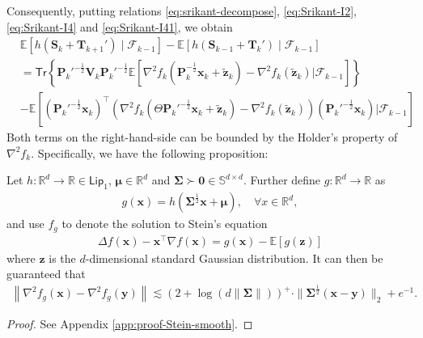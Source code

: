 \medskip
Consequently, putting relations \eqref{eq:srikant-decompose}, \eqref{eq:Srikant-I2}, \eqref{eq:Srikant-I4} and \eqref{eq:Srikant-I41}, we obtain
\begin{align}\label{eq:Srikant-reorganize}
&\mathbb{E}\left[h(\bm{S}_k + \bm{T}_{k+1}')\mid \mathscr{F}_{k-1}\right] - \mathbb{E}[h(\bm{S}_{k-1} + \bm{T}_k')\mid \mathscr{F}_{k-1}]\nonumber \\ 
&=\mathsf{Tr}\left\{\bm{P}_k'^{-\frac{1}{2}}\bm{V}_k\bm{P}_k'^{-\frac{1}{2}}\mathbb{E}\left[\nabla^2 f_k(\bm{P}_k^{-\frac{1}{2}}\bm{x}_k + \tilde{\bm{z}}_k)-\nabla^2 f_k(\tilde{\bm{z}}_k)\bigg|\mathscr{F}_{k-1}\right]\right\} \nonumber \\ 
&- \mathbb{E}\left[(\bm{P}_k'^{-\frac{1}{2}}\bm{x}_k)^\top (\nabla^2f_k(\Theta \bm{P}_k'^{-\frac{1}{2}}\bm{x}_k + \tilde{\bm{z}}_k) - \nabla^2 f_k(\tilde{\bm{z}}_k))(\bm{P}_k'^{-\frac{1}{2}}\bm{x}_k) \bigg|\mathscr{F}_{k-1}\right]
\end{align}
Both terms on the right-hand-side can be bounded by the Holder's property of $\nabla^2 f_k$. Specifically, we have the following proposition:
\begin{customproposition}\label{prop:Stein-smooth}
Let $h: \mathbb{R}^d \to \mathbb{R} \in \mathsf{Lip}_1$, $\bm{\mu} \in \mathbb{R}^d$ and $\bm{\Sigma} \succ \bm{0} \in \mathbb{S}^{d \times d}$. Further define $g: \mathbb{R}^d \to \mathbb{R}$ as
\begin{align*}
g(\bm{x})= h(\bm{\Sigma}^{\frac{1}{2}}\bm{x} +\bm{\mu}), \quad \forall x \in \mathbb{R}^d,
\end{align*}
and use $f_g$ to denote the solution to Stein's equation
\begin{align*}
\Delta f(\bm{x}) - \bm{x}^\top \nabla f(\bm{x}) = g(\bm{x}) - \mathbb{E}[g(\bm{z})]
\end{align*}
where $\bm{z}$ is the $d$-dimensional standard Gaussian distribution. It can then be guaranteed that
\begin{align}
\left\|\nabla^2 f_g(\bm{x}) - \nabla^2 f_g(\bm{y})\right\| \lesssim (2+\log (d\|\bm{\Sigma}\|))^+ \cdot \|\bm{\Sigma}^{\frac{1}{2}}(\bm{x} - \bm{y})\|_2 + e^{-1}.
\end{align}
\end{customproposition}
\begin{proof} 
See Appendix \ref{app:proof-Stein-smooth}. 
\end{proof}

